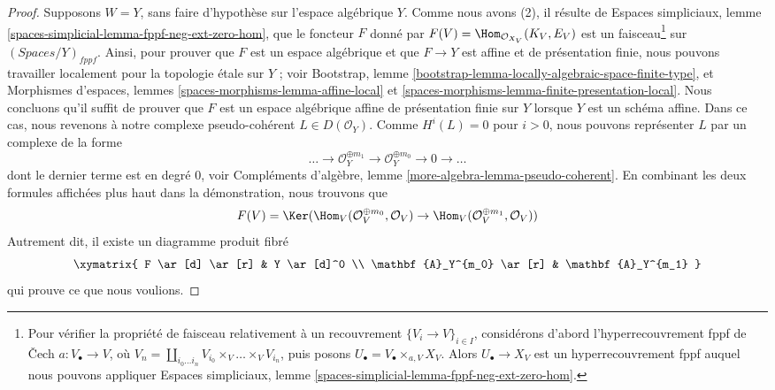 \begin{proof}
\medskip\noindent
Supposons $W = Y$, sans faire d'hypothèse sur l'espace algébrique $Y$.
Comme nous avons (2), il résulte de
Espaces simpliciaux, lemme
\ref{spaces-simplicial-lemma-fppf-neg-ext-zero-hom}, que le foncteur $F$ donné
par $F(V) = \Hom_{\mathcal{O}_{X_V}}(K_V, E_V)$ est un
faisceau\footnote{Pour vérifier la propriété de faisceau relativement à un
recouvrement $\{V_i \to V\}_{i \in I}$, considérons d'abord
l'hyperrecouvrement fppf de {\v C}ech $a : V_\bullet \to V$, où
$V_n = \coprod_{i_0 \ldots i_n} V_{i_0} \times_V \ldots \times_V V_{i_n}$,
puis posons $U_\bullet = V_\bullet \times_{a, V} X_V$. Alors
$U_\bullet \to X_V$ est un hyperrecouvrement fppf auquel nous pouvons
appliquer Espaces simpliciaux, lemme
\ref{spaces-simplicial-lemma-fppf-neg-ext-zero-hom}.}
sur $(\textit{Spaces}/Y)_{fppf}$. Ainsi, pour prouver que $F$ est un espace
algébrique et que $F \to Y$ est affine et de présentation finie, nous pouvons
travailler localement pour la topologie \'etale sur $Y$ ; voir
Bootstrap, lemme \ref{bootstrap-lemma-locally-algebraic-space-finite-type}, et
Morphismes d'espaces, lemmes \ref{spaces-morphisms-lemma-affine-local} et
\ref{spaces-morphisms-lemma-finite-presentation-local}.
Nous concluons qu'il suffit de prouver que $F$ est un espace algébrique affine
de présentation finie sur $Y$ lorsque $Y$ est un schéma affine. Dans ce cas,
nous revenons à notre complexe pseudo-cohérent $L \in D(\mathcal{O}_Y)$.
Comme $H^i(L) = 0$ pour $i > 0$, nous pouvons représenter $L$ par un complexe
de la forme
$$
\ldots \to \mathcal{O}_Y^{\oplus m_1} \to \mathcal{O}_Y^{\oplus m_0}
\to 0 \to \ldots
$$
dont le dernier terme est en degré $0$, voir Compléments d'algèbre, lemme
\ref{more-algebra-lemma-pseudo-coherent}. En combinant les deux formules
affichées plus haut dans la démonstration, nous trouvons que
$$
F(V) =
\Ker(
\Hom_V(\mathcal{O}_V^{\oplus m_0}, \mathcal{O}_V)
\to 
\Hom_V(\mathcal{O}_V^{\oplus m_1}, \mathcal{O}_V)
)
$$
Autrement dit, il existe un diagramme produit fibré
$$
\xymatrix{
F \ar[d] \ar[r] & Y \ar[d]^0 \\
\mathbf{A}_Y^{m_0} \ar[r] & \mathbf{A}_Y^{m_1}
}
$$
qui prouve ce que nous voulions.
\end{proof}


